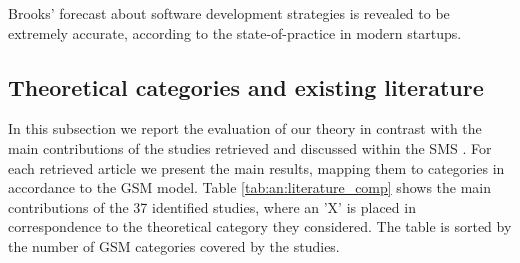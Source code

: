 \documentclass[10pt,journal,letterpaper,compsoc]{IEEEtran}
\begin{document}
Brooks' forecast about software development strategies is revealed to be 
extremely accurate, according to the state-of-practice in modern startups.
\subsection{Theoretical categories and existing literature}
\label{sect:theory:validation:sms}

In this subsection we report the evaluation of our theory in contrast with the 
main contributions of the studies retrieved and discussed within the SMS 
\cite{SMS}. For each retrieved article we present the main results, mapping them 
to categories in accordance to the GSM model. Table \ref{tab:an:literature_comp} 
shows the main contributions of the 37 identified studies, where an 'X' is 
placed in correspondence to the theoretical category they considered. The table 
is sorted by the number of GSM categories covered by the studies.
\end{document}
